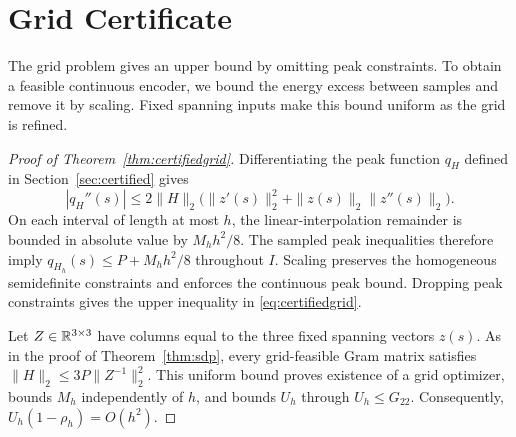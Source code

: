 \section{Grid Certificate}\label{app:grid-proof}
The grid problem gives an upper bound by omitting peak constraints. To obtain a feasible continuous encoder, we bound the energy excess between samples and remove it by scaling. Fixed spanning inputs make this bound uniform as the grid is refined.
\begin{proof}[Proof of Theorem~\ref{thm:certifiedgrid}]
Differentiating the peak function $q_H$ defined in Section~\ref{sec:certified} gives
$$
 |q_H''(s)|\le
 2\|H\|_2\bigl(\|z'(s)\|_2^2+
 \|z(s)\|_2\|z''(s)\|_2\bigr).
$$
On each interval of length at most $h$, the linear-interpolation remainder is bounded in absolute value by $M_hh^2/8$. The sampled peak inequalities therefore imply $q_{H_h}(s)\le P+M_hh^2/8$ throughout $I$. Scaling preserves the homogeneous semidefinite constraints and enforces the continuous peak bound. Dropping peak constraints gives the upper inequality in \eqref{eq:certifiedgrid}.

Let $Z\in\mathbb R^{3\times3}$ have columns equal to the three fixed spanning vectors $z(s)$. As in the proof of Theorem~\ref{thm:sdp}, every grid-feasible Gram matrix satisfies $\|H\|_2\le3P\|Z^{-1}\|_2^2$. This uniform bound proves existence of a grid optimizer, bounds $M_h$ independently of $h$, and bounds $U_h$ through $U_h\le G_{22}$. Consequently, $U_h(1-\rho_h)=O(h^2)$.
\end{proof}
